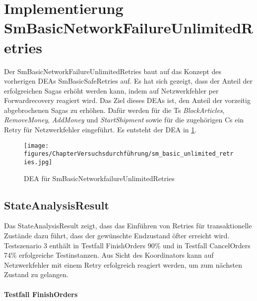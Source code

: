 \section{Implementierung SmBasicNetworkFailureUnlimitedRetries}

Der SmBasicNetworkFailureUnlimitedRetries baut auf das Konzept des vorherigen DEAs SmBasicSafeRetries auf. Es hat sich gezeigt, dass der Anteil der erfolgreichen Sagas erhöht werden kann, indem auf Netzwerkfehler per Forwardrecovery reagiert wird. Das Ziel dieses DEAs ist, den Anteil der vorzeitig abgebrochenen Sagas zu erhöhen. Dafür werden für die Ts \textit{BlockArticles}, \textit{RemoveMoney}, \textit{AddMoney} und \textit{StartShipment} sowie für die zugehörigen Cs ein Retry für Netzwerkfehler eingeführt. Es entsteht der DEA in \cref{fig:SmBasicNetworkfailureUnlimitedRetries}.

\begin{figure}[h!]
	\centering
	\texttt{[image: figures/ChapterVersuchsdurchführung/sm\_basic\_unlimited\_retries.jpg]}
	\caption{DEA für SmBasicNetworkfailureUnlimitedRetries}
	\label{fig:SmBasicNetworkfailureUnlimitedRetries}
\end{figure}
\FloatBarrier

\subsection{StateAnalysisResult}

Das StateAnalysisResult zeigt, dass das Einführen von Retries für transaktionelle Zustände dazu führt, dass der gewünschte Endzustand öfter erreicht wird. Testszenario 3 enthält in Testfall FinishOrders 90\% und in Testfall CancelOrders 74\% erfolgreiche Testinstanzen. Aus Sicht des Koordinators kann auf Netzwerkfehler mit einem Retry erfolgreich reagiert werden, um zum nächsten Zustand zu gelangen.

\paragraph*{Testfall FinishOrders} \mbox{}\\

